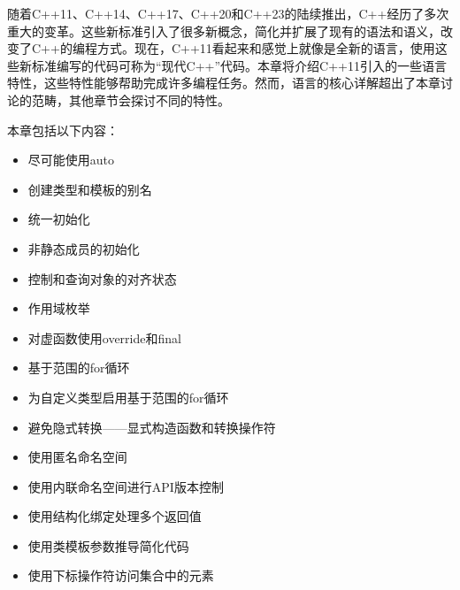 随着C++11、C++14、C++17、C++20和C++23的陆续推出，C++经历了多次重大的变革。这些新标准引入了很多新概念，简化并扩展了现有的语法和语义，改变了C++的编程方式。现在，C++11看起来和感觉上就像是全新的语言，使用这些新标准编写的代码可称为“现代C++”代码。本章将介绍C++11引入的一些语言特性，这些特性能够帮助完成许多编程任务。然而，语言的核心详解超出了本章讨论的范畴，其他章节会探讨不同的特性。

本章包括以下内容：

\begin{itemize}
\item
尽可能使用auto

\item
创建类型和模板的别名

\item
统一初始化

\item
非静态成员的初始化

\item
控制和查询对象的对齐状态

\item
作用域枚举

\item
对虚函数使用override和final

\item
基于范围的for循环

\item
为自定义类型启用基于范围的for循环

\item
避免隐式转换——显式构造函数和转换操作符

\item
使用匿名命名空间

\item
使用内联命名空间进行API版本控制

\item
使用结构化绑定处理多个返回值

\item
使用类模板参数推导简化代码

\item
使用下标操作符访问集合中的元素
\end{itemize}


